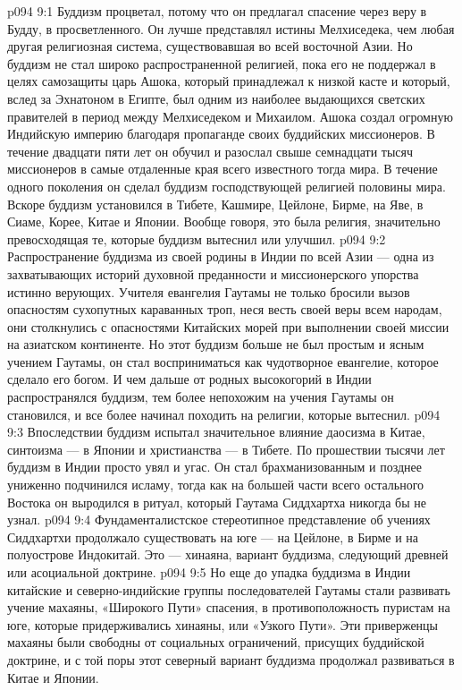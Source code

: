 \vs p094 9:1 Буддизм процветал, потому что он предлагал спасение через веру в Будду, в просветленного. Он лучше представлял истины Мелхиседека, чем любая другая религиозная система, существовавшая во всей восточной Азии. Но буддизм не стал широко распространенной религией, пока его не поддержал в целях самозащиты царь Ашока, который принадлежал к низкой касте и который, вслед за Эхнатоном в Египте, был одним из наиболее выдающихся светских правителей в период между Мелхиседеком и Михаилом. Ашока создал огромную Индийскую империю благодаря пропаганде своих буддийских миссионеров. В течение двадцати пяти лет он обучил и разослал свыше семнадцати тысяч миссионеров в самые отдаленные края всего известного тогда мира. В течение одного поколения он сделал буддизм господствующей религией половины мира. Вскоре буддизм установился в Тибете, Кашмире, Цейлоне, Бирме, на Яве, в Сиаме, Корее, Китае и Японии. Вообще говоря, это была религия, значительно превосходящая те, которые буддизм вытеснил или улучшил.
\vs p094 9:2 Распространение буддизма из своей родины в Индии по всей Азии --- одна из захватывающих историй духовной преданности и миссионерского упорства истинно верующих. Учителя евангелия Гаутамы не только бросили вызов опасностям сухопутных караванных троп, неся весть своей веры всем народам, они столкнулись с опасностями Китайских морей при выполнении своей миссии на азиатском континенте. Но этот буддизм больше не был простым и ясным учением Гаутамы, он стал восприниматься как чудотворное евангелие, которое сделало его богом. И чем дальше от родных высокогорий в Индии распространялся буддизм, тем более непохожим на учения Гаутамы он становился, и все более начинал походить на религии, которые вытеснил.
\vs p094 9:3 Впоследствии буддизм испытал значительное влияние даосизма в Китае, синтоизма --- в Японии и христианства --- в Тибете. По прошествии тысячи лет буддизм в Индии просто увял и угас. Он стал брахманизованным и позднее униженно подчинился исламу, тогда как на большей части всего остального Востока он выродился в ритуал, который Гаутама Сиддхартха никогда бы не узнал.
\vs p094 9:4 Фундаменталистское стереотипное представление об учениях Сиддхартхи продолжало существовать на юге --- на Цейлоне, в Бирме и на полуострове Индокитай. Это --- хинаяна, вариант буддизма, следующий древней или асоциальной доктрине.
\vs p094 9:5 Но еще до упадка буддизма в Индии китайские и северно\hyp{}индийские группы последователей Гаутамы стали развивать учение махаяны, «Широкого Пути» спасения, в противоположность пуристам на юге, которые придерживались хинаяны, или «Узкого Пути». Эти приверженцы махаяны были свободны от социальных ограничений, присущих буддийской доктрине, и с той поры этот северный вариант буддизма продолжал развиваться в Китае и Японии.

